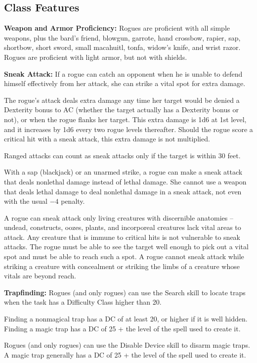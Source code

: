 \subsection{Class Features}
\textbf{Weapon and Armor Proficiency:} Rogues are proficient with all simple weapons, plus the bard's friend, blowgun, garrote, hand crossbow, rapier, sap, shortbow, short sword, small macahuitl, tonfa, widow's knife, and wrist razor. Rogues are proficient with light armor, but not with shields.

\textbf{Sneak Attack:} If a rogue can catch an opponent when he is unable to defend himself effectively from her attack, she can strike a vital spot for extra damage.

The rogue’s attack deals extra damage any time her target would be denied a Dexterity bonus to AC (whether the target actually has a Dexterity bonus or not), or when the rogue flanks her target. This extra damage is 1d6 at 1st level, and it increases by 1d6 every two rogue levels thereafter. Should the rogue score a critical hit with a sneak attack, this extra damage is not multiplied.

Ranged attacks can count as sneak attacks only if the target is within 30 feet.

With a sap (blackjack) or an unarmed strike, a rogue can make a sneak attack that deals nonlethal damage instead of lethal damage. She cannot use a weapon that deals lethal damage to deal nonlethal damage in a sneak attack, not even with the usual $-4$ penalty.

A rogue can sneak attack only living creatures with discernible anatomies -- undead, constructs, oozes, plants, and incorporeal creatures lack vital areas to attack. Any creature that is immune to critical hits is not vulnerable to sneak attacks. The rogue must be able to see the target well enough to pick out a vital spot and must be able to reach such a spot. A rogue cannot sneak attack while striking a creature with concealment or striking the limbs of a creature whose vitals are beyond reach.

\textbf{Trapfinding:} Rogues (and only rogues) can use the Search skill to locate traps when the task has a Difficulty Class higher than 20.

Finding a nonmagical trap has a DC of at least 20, or higher if it is well hidden. Finding a magic trap has a DC of 25 + the level of the spell used to create it.

Rogues (and only rogues) can use the Disable Device skill to disarm magic traps. A magic trap generally has a DC of 25 + the level of the spell used to create it.

